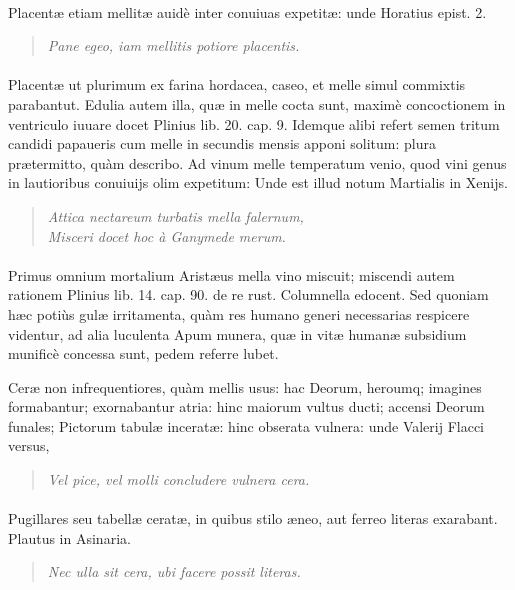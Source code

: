 \documentclass[a4paper, 11pt, oneside, polutonikogreek, latin]{article}
\begin{document}
\paragraph{}
Placentæ etiam mellitæ auidè inter conuiuas expetitæ: unde Horatius epist. 2.
\begin{quote}
\emph{Pane egeo, iam mellitis potiore placentis.}
\end{quote}
\vspace*{-4mm}
\paragraph{}
Placentæ ut plurimum ex farina hordacea, caseo, et melle simul commixtis parabantut. Edulia autem illa, quæ in melle cocta sunt, maximè concoctionem in ventriculo iuuare docet Plinius lib. 20. cap. 9. Idemque alibi refert semen tritum candidi papaueris cum melle in secundis mensis apponi solitum: plura prætermitto, quàm describo. Ad vinum melle temperatum venio, quod vini genus in lautioribus conuiuijs olim expetitum: Unde est illud notum Martialis in Xenijs.
\begin{quote}
\emph{Attica nectareum turbatis mella falernum,}\\
\hspace*{10mm}\emph{Misceri docet hoc à Ganymede merum.}\\
\end{quote}
\vspace*{-8mm}
\paragraph{}
Primus omnium mortalium Aristæus mella vino miscuit; miscendi autem rationem Plinius lib. 14. cap. 90. de re rust. Columnella edocent. Sed quoniam hæc potiùs gulæ irritamenta, quàm res humano generi necessarias respicere videntur, ad alia luculenta Apum munera, quæ in vitæ humanæ subsidium munificè concessa sunt, pedem referre lubet.

Ceræ non infrequentiores, quàm mellis usus: hac Deorum, heroumq; imagines formabantur; exornabantur atria: hinc maiorum vultus ducti; accensi Deorum funales; Pictorum tabulæ inceratæ: hinc obserata vulnera: unde Valerij Flacci versus,
\begin{quote}
\emph{Vel pice, vel molli concludere vulnera cera.}
\end{quote}
\vspace*{-4mm}
\paragraph{}
Pugillares seu tabellæ ceratæ, in quibus stilo æneo, aut ferreo literas exarabant. Plautus in Asinaria.
\begin{quote}
\emph{Nec ulla sit cera, ubi facere possit literas.}
\end{quote}
\vspace*{-4mm}
\end{document}
